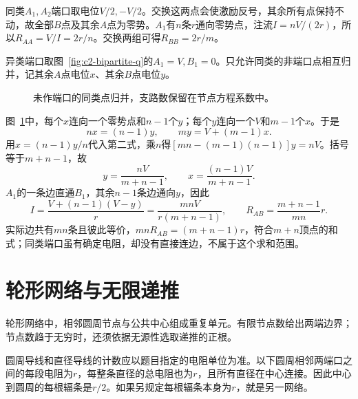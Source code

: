 \begin{solution}
同类$A_1,A_2$端口取电位$V/2,-V/2$。交换这两点会使激励反号，其余所有点保持不动，故全部$B$点及其余$A$点为零势。$A_1$有$n$条$r$通向零势点，注流$I=nV/(2r)$，所以$R_{AA}=V/I=2r/n$。交换两组可得$R_{BB}=2r/m$。

异类端口取图~\ref{fig:c2-bipartite-q}的$A_1=V,B_1=0$。只允许同类的非端口点相互归并，记其余$A$点电位$x$、其余$B$点电位$y$。
\begin{figure}[H]\centering
{}
\caption{未作端口的同类点归并，支路数保留在节点方程系数中。}\label{fig:c2-bipartite-s}
\end{figure}
图~\ref{fig:c2-bipartite-s}中，每个$x$连向一个零势点和$n-1$个$y$；每个$y$连向一个$V$和$m-1$个$x$。于是
\[
 nx=(n-1)y,\qquad my=V+(m-1)x.
\]
用$x=(n-1)y/n$代入第二式，乘$n$得$[mn-(m-1)(n-1)]y=nV$。括号等于$m+n-1$，故
\[
 y=\frac{nV}{m+n-1},\qquad x=\frac{(n-1)V}{m+n-1}.
\]
$A_1$的一条边直通$B_1$，其余$n-1$条边通向$y$，因此
\[
 I=\frac{V+(n-1)(V-y)}r=\frac{mnV}{r(m+n-1)},
 \qquad\boxed{R_{AB}=\frac{m+n-1}{mn}r}.
\]
实际边共有$mn$条且彼此等价，$mnR_{AB}=(m+n-1)r$，符合$m+n$顶点的和式；同类端口虽有确定电阻，却没有直接连边，不属于这个求和范围。
\end{solution}


\section{轮形网络与无限递推}\label{sec:c2-wheel-recur}
轮形网络中，相邻圆周节点与公共中心组成重复单元。有限节点数给出两端边界；节点数趋于无穷时，还须依据无源性选取递推的正根。

圆周导线和直径导线的计数应以题目指定的电阻单位为准。以下圆周相邻两端口之间的每段电阻为$r$，每整条直径的总电阻也为$r$，且所有直径在中心连接。因此中心到圆周的每根辐条是$r/2$。如果另规定每根辐条本身为$r$，就是另一网络。

